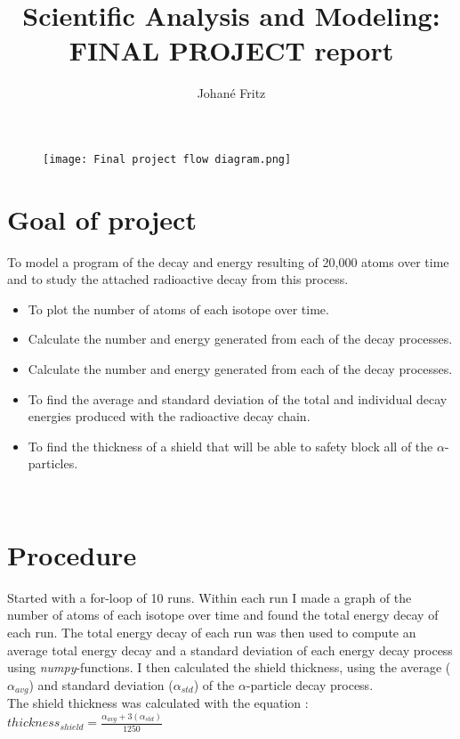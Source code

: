 \documentclass[12pt, letterpaper, twoside]{article}
\title{\textbf{Scientific Analysis and Modeling:\\FINAL PROJECT report}}
\author{Johané Fritz}
\affiliation{Texas Christian University}
\begin{document}
\maketitle



\begin{figure}[hbt!]
    \centering
    \texttt{[image: Final project flow diagram.png]}
\end{figure}

\thispagestyle{firstpage}

\pagebreak


\newgeometry{} %

\section{Goal of project}
\label{sec:intro}
To model a program of the decay and energy resulting of 20,000 atoms over time and to study the attached radioactive decay from this process.
\begin{itemize}
  \item To plot the number of atoms of each isotope over time.
  \item Calculate the number and energy generated from each of the decay processes.
  \item Calculate the number and energy generated from each of the decay processes.
  \item To find the average and standard deviation of the total and individual decay energies produced with the radioactive decay chain.
  \item To find the thickness of a shield that will be able to safety block all of the $\alpha$-particles. 
\end{itemize} \\

\section{Procedure}
\label{sec:conc}

Started with a for-loop of 10 runs. Within each run I made a graph of the number of atoms of each isotope over time and found the total energy decay of each run. The total energy decay of each run was then used to compute an average total energy decay and a standard deviation of each energy decay process using \textit{numpy}-functions. I then calculated the shield thickness, using the average ($\alpha_{avg}$) and standard deviation ($\alpha_{std}$) of the $\alpha$-particle decay process. \\ The shield thickness was calculated with the equation :  $thickness_{shield} = \frac{\alpha_{avg}  +  3(\alpha_{std})}{1250}$
\end{document}
